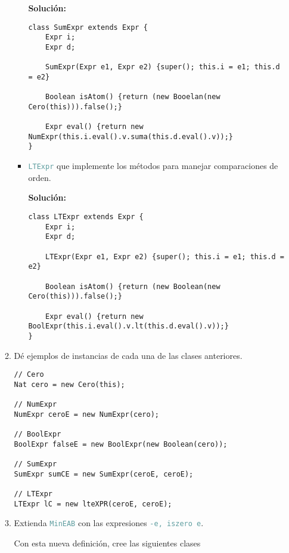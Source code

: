 \documentclass{article}
\newcommand{\tp}[1]{\textcolor{CadetBlue} {\texttt{#1}}}
\newcommand{\tb}[1]{\textcolor{RoyalPurple} {\textbf{#1}}}
\begin{document}
\begin{enumerate}
\begin{enumerate}
\begin{itemize}
                \tb{Solución:}

                \begin{verbatim}
class SumExpr extends Expr {
    Expr i;
    Expr d;

    SumExpr(Expr e1, Expr e2) {super(); this.i = e1; this.d = e2}

    Boolean isAtom() {return (new Booelan(new Cero(this))).false();}

    Expr eval() {return new NumExpr(this.i.eval().v.suma(this.d.eval().v));}
}
                \end{verbatim}

                \item \tp{LTExpr} que implemente los métodos para manejar
                comparaciones de orden.

                \tb{Solución:}

                \begin{verbatim}
class LTExpr extends Expr {
    Expr i;
    Expr d;

    LTExpr(Expr e1, Expr e2) {super(); this.i = e1; this.d = e2}

    Boolean isAtom() {return (new Boolean(new Cero(this))).false();}

    Expr eval() {return new BoolExpr(this.i.eval().v.lt(this.d.eval().v));}
}
                \end{verbatim}

            \end{itemize}

            \item Dé ejemplos de instancias de cada una de las clases
            anteriores.

            \begin{verbatim}
// Cero
Nat cero = new Cero(this);

// NumExpr
NumExpr ceroE = new NumExpr(cero);

// BoolExpr
BoolExpr falseE = new BoolExpr(new Boolean(cero));

// SumExpr
SumExpr sumCE = new SumExpr(ceroE, ceroE);

// LTExpr
LTExpr lC = new lteXPR(ceroE, ceroE);
            \end{verbatim}

            \item Extienda \tp{MinEAB} con las expresiones \tp{-e, iszero e}.

            Con esta nueva definición, cree las siguientes clases


\end{enumerate}
\end{enumerate}
\end{document}
